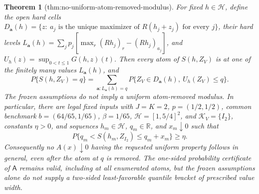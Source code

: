 \documentclass{article}
\newtheorem{theorem}{Theorem}
\begin{document}
\begin{theorem}[thm:no-uniform-atom-removed-modulus]\label{thm:no-uniform-atom-removed-modulus}
For fixed \(h\in\mathcal H\), define the open hard cells \(D_{\mathbf a}(h)=\{z:\ a_j\text{ is the unique maximizer of }R(h_j+z_j)\text{ for every }j\}\), their hard levels \(L_{\mathbf a}(h)=\sum_jp_j[\max_r(Rh_j)_r-(Rh_j)_{a_j}]\), and \(U_h(z)=\sup_{0<t\le1}G(h,z)(t)\).  Then every atom of \(S(h,Z_V)\) is at one of the finitely many values \(L_{\mathbf a}(h)\), and
\[
 P\{S(h,Z_V)=q\}=\sum_{\mathbf a:L_{\mathbf a}(h)=q}P\{Z_V\in D_{\mathbf a}(h),\ U_h(Z_V)\le q\}.
\]
The frozen assumptions do not imply a uniform atom-removed modulus.  In particular, there are legal fixed inputs with \(J=K=2\), \(p=(1/2,1/2)\), common benchmark \(b=(64/65,1/65)\), \(\beta=1/65\), \(\mathcal H=[1,5/4]^2\), and \(\mathcal K_V=\{I_2\}\), constants \(\eta>0\), and sequences \(h_m\in\mathcal H\), \(q_m\in\mathbb R\), and \(x_m\downarrow0\) such that
\[
 P\{q_m<S(h_m,Z_{I_2})\le q_m+x_m\}\ge\eta.
\]
Consequently no \(A(x)\downarrow0\) having the requested uniform property follows in general, even after the atom at \(q\) is removed.  The one-sided probability certificate of \(\mathsf A\) remains valid, including at all enumerated atoms, but the frozen assumptions alone do not supply a two-sided least-favorable quantile bracket of prescribed value width.
\end{theorem}
\end{document}
